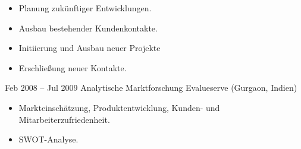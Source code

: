 \documentclass[a4paper,]{fortysecondscv}
\begin{document}
\begin{cvtable}[4]
{\begin{itemize}[nosep, leftmargin=0pt]
					\item Planung zukünftiger Entwicklungen.
					\item Ausbau bestehender Kundenkontakte.
					\item Initiierung und Ausbau neuer Projekte
					\item Erschließung neuer Kontakte.
				\end{itemize}
			}
		\cvitem
			{Feb 2008 -- Jul 2009}
			{Analytische Marktforschung}
			{Evalueserve (Gurgaon, Indien)}
			{
				\vspace{-\topsep}
				\begin{itemize}[nosep, leftmargin=0pt] %
					\item Markteinschätzung, Produktentwicklung, Kunden- und Mitarbeiterzufriedenheit.
					\item SWOT-Analyse.
				\end{itemize}
			}
	\end{cvtable}





\newpage
\makebacksidebar

\end{document}
